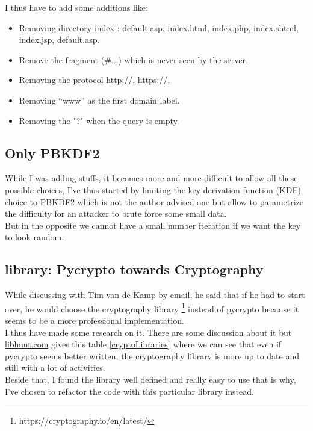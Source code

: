 \documentclass{eplmastersthesis}
\begin{document}
I thus have to add some additions like:
\begin{itemize}
\item Removing directory index : {default.asp, index.html, index.php, index.shtml, index.jsp, default.asp}.
\item Remove the fragment (\#...) which is never seen by the server.
\item Removing the protocol {http://, https://}.
\item Removing  “www” as the first domain label.
\item Removing the "?" when the query is empty.
\end{itemize}

\subsection{Only PBKDF2}
While I was adding stuffs, it becomes more and more difficult to allow all these possible choices, I've thus started by limiting the key derivation function (KDF) choice to PBKDF2 which is not the author advised one but allow to parametrize the difficulty for an attacker to brute force some small data.\\
But in the opposite we cannot have a small number iteration if we want the key to look random.

\subsection{library: Pycrypto towards Cryptography}
While discussing with Tim van de Kamp by email, he said that if he had to start over, he would choose the cryptography library \footnote{https://cryptography.io/en/latest/} instead of pycrypto because it seems to be a more professional implementation.\\
I thus have made some research on it. There are some discussion about it but \url{libhunt.com} gives this table \ref{cryptoLibraries} where we can see that even if pycrypto seems better written, the cryptography library is more up to date and still with a lot of activities.\\
Beside that, I found the library well defined and really easy to use that is why, I've chosen to refactor the code with this particular library instead.
\end{document}
